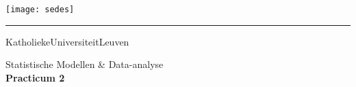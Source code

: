 \begin{titlepage}
    \newpage
    \thispagestyle{empty}
    \frenchspacing
    \hspace{-0.2cm}
    \texttt{[image: sedes]}
    \hspace{0.2cm}
    \rule{0.5pt}{4.2cm}
    \hspace{0.2cm}
    \begin{minipage}[b]{8cm}
        \Large{Katholieke\newline Universiteit\newline Leuven}\smallskip\newline
    \end{minipage}
    \vspace*{3.2cm}\vfill
    \begin{center}
        \begin{minipage}[t]{\textwidth}
            \begin{center}
            	\LARGE{\rm{Statistische Modellen \& Data-analyse}}\\[5mm]
                \LARGE{\rm{\textbf{Practicum 2}}}
            \end{center}
        \end{minipage}
    \end{center}
    \vfill
    \hfill{}
\end{titlepage}